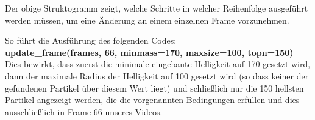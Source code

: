 Der obige Struktogramm zeigt, welche Schritte in welcher Reihenfolge ausgeführt werden müssen, um eine Änderung an einem einzelnen Frame vorzunehmen.

So führt die Ausführung des folgenden Codes:\\
\textbf{update\_frame(frames, 66, minmass=170, maxsize=100, topn=150)}\\
Dies bewirkt, dass zuerst die minimale eingebaute Helligkeit auf 170 gesetzt wird, dann der maximale Radius der Helligkeit auf 100 gesetzt wird (so dass keiner der gefundenen Partikel über diesem Wert liegt) und schließlich nur die 150 hellsten Partikel angezeigt werden, die die vorgenannten Bedingungen erfüllen und dies ausschließlich in Frame 66 unseres Videos.







